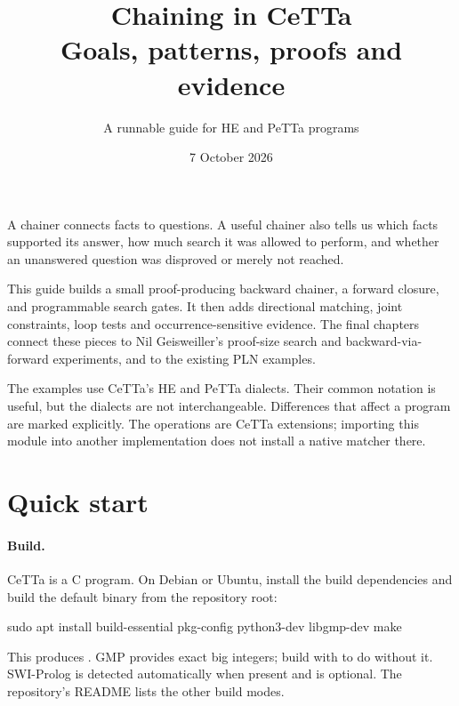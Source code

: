 \documentclass[11pt,a4paper]{article}
\title{Chaining in CeTTa\\\large Goals, patterns, proofs and evidence}
\author{A runnable guide for HE and PeTTa programs}
\date{7 October 2026}
\begin{document}
\maketitle

A chainer connects facts to questions. A useful chainer also tells us which
facts supported its answer, how much search it was allowed to perform, and
whether an unanswered question was disproved or merely not reached.

This guide builds a small proof-producing backward chainer, a forward closure,
and programmable search gates. It then adds directional matching, joint
constraints, loop tests and occurrence-sensitive evidence. The final chapters
connect these pieces to Nil Geisweiller's proof-size search and
backward-via-forward experiments, and to the existing PLN examples.

The examples use CeTTa's HE and PeTTa dialects. Their common notation is useful,
but the dialects are not interchangeable. Differences that affect a program
are marked explicitly. The  operations are CeTTa extensions; importing
this module into another implementation does not install a native matcher there.

\begin{center}
\end{center}

\newpage
\tableofcontents
\newpage
\section{Quick start}

\paragraph{Build.} CeTTa is a C program. On Debian or Ubuntu, install the
build dependencies and build the default binary from the repository root:
\begin{code}
sudo apt install build-essential pkg-config python3-dev libgmp-dev
make
\end{code}
This produces . GMP provides exact big integers; build with
 to do without it. SWI-Prolog is detected
automatically when present and is optional. The repository's README lists the
other build modes.
\end{document}
